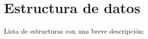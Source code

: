 \section{Estructura de datos}
Lista de estructuras con una breve descripción\+:\begin{DoxyCompactList}
\item{}
\end{DoxyCompactList}
